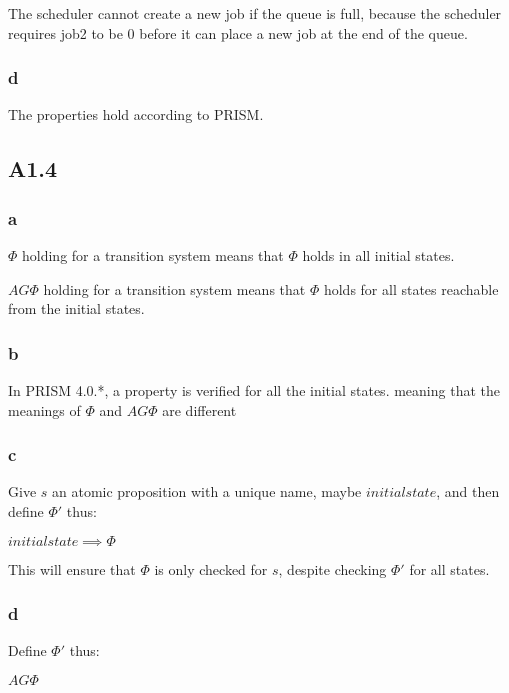 The scheduler cannot create a new job if the queue is full, because the scheduler
requires job2 to be 0 before it can place a new job at the end of the queue.

\subsubsection{d}

The properties hold according to PRISM.

\subsection{A1.4}

\subsubsection{a}

$\Phi$ holding for a transition system means that $\Phi$ holds
in all initial states.

$AG \Phi$ holding for a transition system means that $\Phi$ holds
for all states reachable from the initial states.

\subsubsection{b}

In PRISM 4.0.*, a property is verified for all the initial states.
meaning that the meanings of $\Phi$ and $AG \Phi$ are different

\subsubsection{c}

Give $s$ an atomic proposition with a unique name,
maybe $initialstate$, and then define $\Phi '$ thus:

$initialstate \implies \Phi$

This will ensure that $\Phi$ is only checked for $s$,
despite checking $\Phi '$ for all states.

\subsubsection{d}

Define $\Phi '$ thus:

$AG \Phi$

